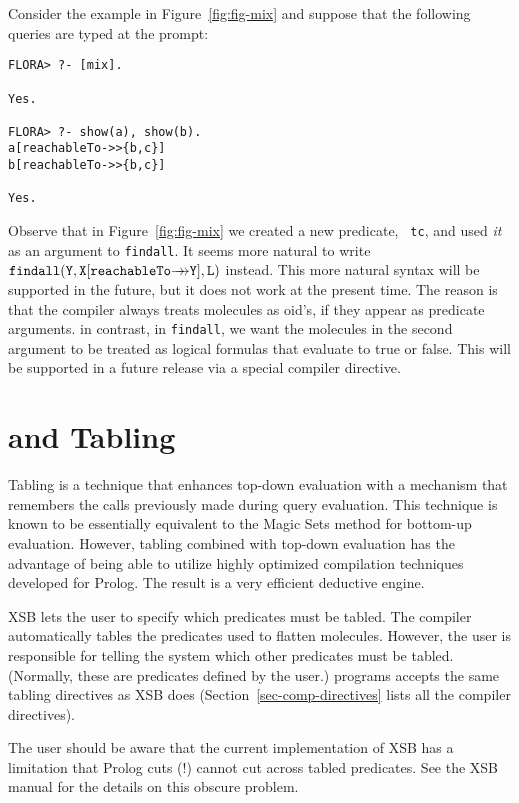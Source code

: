 \documentclass[11pt]{report}
\begin{document}
Consider the example in Figure~\ref{fig:fig-mix} and suppose that the
following queries are typed at the \FLORA prompt:
\begin{verbatim}
FLORA> ?- [mix].

Yes.

FLORA> ?- show(a), show(b).
a[reachableTo->>{b,c}]
b[reachableTo->>{b,c}]

Yes.
\end{verbatim}

Observe that in Figure~\ref{fig:fig-mix} we created a new predicate, {\tt
  tc}, and used \emph{it} as an argument to {\tt findall}. It seems more
natural to write $\mathtt{findall(Y,X[reachableTo{{\rightarrow\!\!\!\!\rightarrow}}Y],L)}$ instead.
This more natural syntax will be supported in the future, but it does not
work at the present time. The reason is that the \FLORA compiler always
treats \fl molecules as oid's, if they appear as predicate arguments. in
contrast, in {\tt findall}, we want the molecules in the second argument to
be treated as logical formulas that evaluate to true or false.  This will
be supported in a future release via a special compiler directive.

\section{\FLORA and Tabling}\label{sec-tabling-flora}

Tabling is a technique that enhances top-down evaluation with a mechanism
that remembers the calls previously made during query evaluation.
This technique is known to be essentially equivalent to the Magic Sets
method for bottom-up evaluation. However, tabling combined with top-down
evaluation has the advantage of being able to utilize highly optimized
compilation techniques developed for Prolog. The result is a very efficient
deductive engine.

XSB lets the user to specify which predicates must be tabled.  The \FLORA
compiler automatically tables the predicates used to flatten \fl molecules.
However, the user is responsible for telling the system which other
predicates must be tabled. (Normally, these are predicates defined by the
user.)  \FLORA programs accepts the same tabling directives as XSB does
(Section~\ref{sec-comp-directives} lists all the compiler directives).

The user should be aware that the current implementation of XSB has a
limitation that Prolog cuts (!) cannot cut across tabled predicates. See
the XSB manual for the details on this obscure problem.
\end{document}
